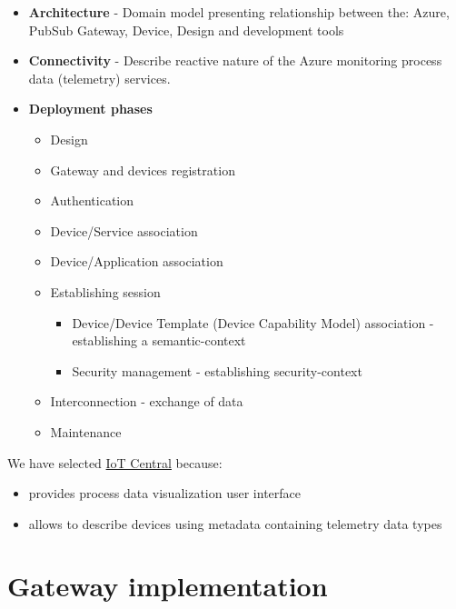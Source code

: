 \documentclass[
]{article}
\providecommand{\tightlist}{%
  \setlength{\itemsep}{0pt}\setlength{\parskip}{0pt}}
\begin{document}
\begin{itemize}
\tightlist
\item
  \textbf{Architecture} - Domain model presenting relationship between
  the: Azure, PubSub Gateway, Device, Design and development tools
\item
  \textbf{Connectivity} - Describe reactive nature of the Azure
  monitoring process data (telemetry) services.
\item
  \textbf{Deployment phases}

  \begin{itemize}
  \tightlist
  \item
    Design
  \item
    Gateway and devices registration
  \item
    Authentication
  \item
    Device/Service association
  \item
    Device/Application association
  \item
    Establishing session

    \begin{itemize}
    \tightlist
    \item
      Device/Device Template (Device Capability Model) association -
      establishing a semantic-context
    \item
      Security management - establishing security-context
    \end{itemize}
  \item
    Interconnection - exchange of data
  \item
    Maintenance
  \end{itemize}
\end{itemize}

We have selected
\href{https://docs.microsoft.com/azure/iot-central/core/}{IoT Central}
because:

\begin{itemize}
\tightlist
\item
  provides process data visualization user interface
\item
  allows to describe devices using metadata containing telemetry data
  types
\end{itemize}

\hypertarget{gateway-implementation}{%
\section{Gateway implementation}\label{gateway-implementation}}
\end{document}
